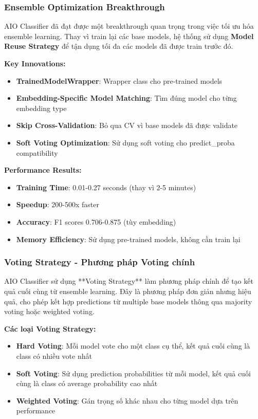 \subsubsection{Ensemble Optimization Breakthrough}

AIO Classifier đã đạt được một breakthrough quan trọng trong việc tối ưu hóa ensemble learning. Thay vì train lại các base models, hệ thống sử dụng \textbf{Model Reuse Strategy} để tận dụng tối đa các models đã được train trước đó.

\textbf{Key Innovations:}
\begin{itemize}
    \item \textbf{TrainedModelWrapper}: Wrapper class cho pre-trained models
    \item \textbf{Embedding-Specific Model Matching}: Tìm đúng model cho từng embedding type
    \item \textbf{Skip Cross-Validation}: Bỏ qua CV vì base models đã được validate
    \item \textbf{Soft Voting Optimization}: Sử dụng soft voting cho predict\_proba compatibility
\end{itemize}

\textbf{Performance Results:}
\begin{itemize}
    \item \textbf{Training Time}: 0.01-0.27 seconds (thay vì 2-5 minutes)
    \item \textbf{Speedup}: 200-500x faster
    \item \textbf{Accuracy}: F1 scores 0.706-0.875 (tùy embedding)
    \item \textbf{Memory Efficiency}: Sử dụng pre-trained models, không cần train lại
\end{itemize}

\subsubsection{Voting Strategy - Phương pháp Voting chính}

AIO Classifier sử dụng **Voting Strategy** làm phương pháp chính để tạo kết quả cuối cùng từ ensemble learning. Đây là phương pháp đơn giản nhưng hiệu quả, cho phép kết hợp predictions từ multiple base models thông qua majority voting hoặc weighted voting.

\textbf{Các loại Voting Strategy:}
\begin{itemize}
    \item \textbf{Hard Voting}: Mỗi model vote cho một class cụ thể, kết quả cuối cùng là class có nhiều vote nhất
    \item \textbf{Soft Voting}: Sử dụng prediction probabilities từ mỗi model, kết quả cuối cùng là class có average probability cao nhất
    \item \textbf{Weighted Voting}: Gán trọng số khác nhau cho từng model dựa trên performance
\end{itemize}

